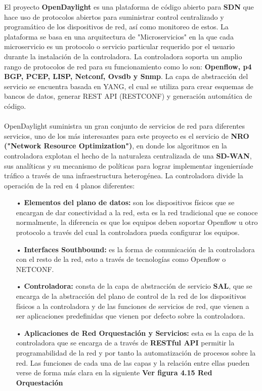 El proyecto \textbf{OpenDaylight} es una plataforma de código abierto para \textbf{SDN} que hace
uso de protocolos abiertos para suministrar control centralizado y programático de los
dispositivos de red, así como monitoreo de estos. La plataforma se basa en una arquitectura de "Microservicios" en la que cada microservicio es un protocolo o servicio particular requerido por el usuario durante la instalación de la controladora. La controladora soporta un amplio rango de protocolos de red para su funcionamiento como lo son: \textbf{Openflow, p4 BGP, PCEP, LISP, Netconf, Ovsdb y Snmp}. La capa de abstracción
del servicio se encuentra basada en YANG, el cual se utiliza para crear esquemas de bancos de datos, generar REST API (RESTCONF) y generación automática de código.
\\
\\
OpenDaylight suministra un gran conjunto de servicios de red para diferentes servicios, uno de los más interesantes para este proyecto es el servicio de \textbf{NRO ("Network Resource Optimization")}, en donde los algoritmos en la controladora explotan el hecho de la naturaleza centralizada de una \textbf{SD-WAN}, sus analíticas y su mecanismo de políticas para lograr implementar ingenierıíade tráfico a través de una infraestructura heterogénea. La controladora divide la operación de la red en 4 planos diferentes:
\begin{itemize}
\item[•]\textbf{Elementos del plano de datos:} son los dispositivos físicos que se encargan de dar conectividad a la red, esta es la red tradicional que se conoce normalmente, la diferencia es que los equipos deben soportar Openflow u otro protocolo a través del cual la controladora pueda configurar los equipos.

\item[•]\textbf{Interfaces Southbound:} es la forma de comunicación de la controladora con el resto de la red, esto a través de tecnologías como Openflow o NETCONF.
\item[•]\textbf{Controladora:} consta de la capa de abstracción de servicio \textbf{SAL}, que se encarga
de la abstracción del plano de control de la red de los dispositivos físicos a la controladora y de las funciones de servicios de red, que vienen a ser aplicaciones predefinidas que vienen por defecto sobre la controladora.
\item[•]\textbf{Aplicaciones de Red Orquestación y Servicios:} esta es la capa de la controladora que se encarga de a través de \textbf{RESTful API} permitir la programabilidad de la red y por tanto la automatización de procesos sobre la red. Las funciones de cada una de las capas y la relación entre ellas pueden verse de forma más clara en la siguiente \textbf{Ver figura 4.15 Red Orquestación}

\end{itemize}

